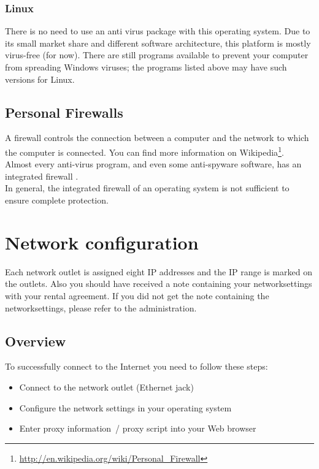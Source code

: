 \documentclass[a4paper,12pt]{scrartcl}
\begin{document}
\subsubsection*{Linux}

There is no need to use an anti virus package with this operating system. Due to its small market share and different software architecture, this platform is mostly virus-free (for now). There are still programs available to prevent your computer from spreading Windows viruses; the programs listed above may have such versions for Linux.


\subsection*{Personal Firewalls}

A firewall controls the connection between a computer and the network to which the computer is connected. You can find more information on Wikipedia\footnote{\url{http://en.wikipedia.org/wiki/Personal\_Firewall}}.
\\
Almost every anti-virus program, and even some anti-spyware software, has an integrated firewall .
\\
In general, the integrated firewall of an operating system is not sufficient to ensure complete protection.

\newpage
\section*{Network configuration}

Each network outlet is assigned eight IP addresses and the IP range is marked on the outlets. Also you should have received a note containing your networksettings with your rental agreement. If you did not get the note containing the networksettings, please refer to the administration.

\subsection*{Overview}

To successfully connect to the Internet you need to follow these steps:
\begin{itemize}
    \item Connect to the network outlet (Ethernet jack)
    \item Configure the network settings in your operating system
    \item Enter proxy information~/ proxy script into your Web browser
\end{itemize}
\end{document}
